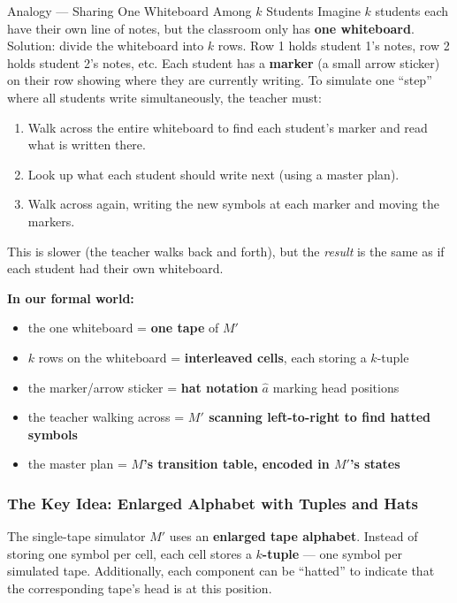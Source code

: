 \begin{notebox}{Analogy --- Sharing One Whiteboard Among $k$ Students}
Imagine $k$ students each have their own line of notes, but the classroom only has \textbf{one whiteboard}. Solution: divide the whiteboard into $k$ rows. Row 1 holds student 1's notes, row 2 holds student 2's notes, etc. Each student has a \textbf{marker} (a small arrow sticker) on their row showing where they are currently writing. To simulate one ``step'' where all students write simultaneously, the teacher must:
\begin{enumerate}[nosep]
\item Walk across the entire whiteboard to find each student's marker and read what is written there.
\item Look up what each student should write next (using a master plan).
\item Walk across again, writing the new symbols at each marker and moving the markers.
\end{enumerate}

This is slower (the teacher walks back and forth), but the \textit{result} is the same as if each student had their own whiteboard.

\textbf{In our formal world:}
\begin{itemize}[nosep]
\item the one whiteboard = \textbf{one tape} of $M'$
\item $k$ rows on the whiteboard = \textbf{interleaved cells}, each storing a $k$-tuple
\item the marker/arrow sticker = \textbf{hat notation} $\hat{a}$ marking head positions
\item the teacher walking across = \textbf{$M'$ scanning left-to-right to find hatted symbols}
\item the master plan = \textbf{$M$'s transition table, encoded in $M'$'s states}
\end{itemize}
\end{notebox}

\subsubsection{The Key Idea: Enlarged Alphabet with Tuples and Hats}

The single-tape simulator $M'$ uses an \textbf{enlarged tape alphabet}. Instead of storing one symbol per cell, each cell stores a \textbf{$k$-tuple} --- one symbol per simulated tape. Additionally, each component can be ``hatted'' to indicate that the corresponding tape's head is at this position.

